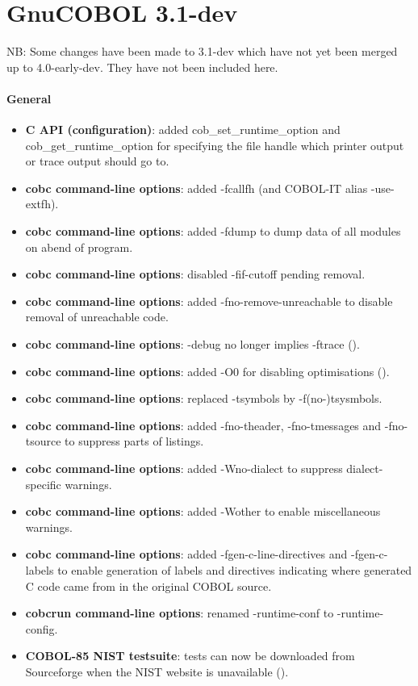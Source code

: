\section{GnuCOBOL 3.1-dev}

NB: Some changes have been made to 3.1-dev which have not yet been merged up to 4.0-early-dev. They have not been included here.

\paragraph{General}
\begin{itemize}
\item \textbf{C API (configuration)}: added cob\_set\_runtime\_option and cob\_get\_runtime\_option for specifying the file handle which printer output or trace output should go to.
\item \textbf{cobc command-line options}: added -fcallfh (and COBOL-IT alias -use-extfh).
\item \textbf{cobc command-line options}: added -fdump to dump data of all modules on abend of program.
\item \textbf{cobc command-line options}: disabled -fif-cutoff pending removal.
\item \textbf{cobc command-line options}: added -fno-remove-unreachable to disable removal of unreachable code.
\item \textbf{cobc command-line options}: -debug no longer implies -ftrace ().
\item \textbf{cobc command-line options}: added -O0 for disabling optimisations ().
\item \textbf{cobc command-line options}: replaced -tsymbols by -f(no-)tsysmbols.
\item \textbf{cobc command-line options}: added -fno-theader, -fno-tmessages and -fno-tsource to suppress parts of listings.
\item \textbf{cobc command-line options}: added -Wno-dialect to suppress dialect-specific warnings.
\item \textbf{cobc command-line options}: added -Wother to enable miscellaneous warnings.
\item \textbf{cobc command-line options}: added -fgen-c-line-directives and -fgen-c-labels to enable generation of labels and directives indicating where generated C code came from in the original COBOL source.
\item \textbf{cobcrun command-line options}: renamed -runtime-conf to -runtime-config.
\item \textbf{COBOL-85 NIST testsuite}: tests can now be downloaded from Sourceforge when the NIST website is unavailable ().

\end{itemize}
